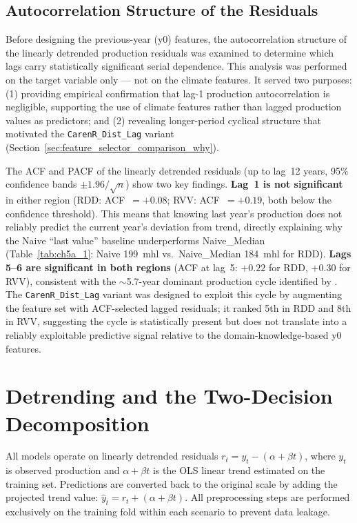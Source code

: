 \subsection{Autocorrelation Structure of the Residuals}\label{sub:autocorrelation_structure_of_the}

Before designing the previous-year (y0) features, the autocorrelation structure of the linearly detrended production residuals was examined to determine which lags carry statistically significant serial dependence. This analysis was performed on the target variable only --- not on the climate features. It served two purposes: (1) providing empirical confirmation that lag-1 production autocorrelation is negligible, supporting the use of climate features rather than lagged production values as predictors; and (2) revealing longer-period cyclical structure that motivated the \texttt{CarenR\_Dist\_Lag} variant (Section~\ref{sec:feature_selector_comparison_why}).

The ACF and PACF of the linearly detrended residuals (up to lag~12 years, 95\% confidence bands $\pm 1.96/\sqrt{n}$) show two key findings. \textbf{Lag~1 is not significant} in either region (RDD: ACF~$= +0.08$; RVV: ACF~$= +0.19$, both below the confidence threshold). This means that knowing last year's production does not reliably predict the current year's deviation from trend, directly explaining why the Naive ``last value'' baseline underperforms Naive\_Median (Table~\ref{tab:ch5a_1}: Naive 199~mhl vs.\ Naive\_Median 184~mhl for RDD). \textbf{Lags 5--6 are significant in both regions} (ACF at lag~5: $+0.22$ for RDD, $+0.30$ for RVV), consistent with the $\sim$5.7-year dominant production cycle identified by \citet{Cunha2020}. The \texttt{CarenR\_Dist\_Lag} variant was designed to exploit this cycle by augmenting the feature set with ACF-selected lagged residuals; it ranked 5th in RDD and 8th in RVV, suggesting the cycle is statistically present but does not translate into a reliably exploitable predictive signal relative to the domain-knowledge-based y0 features.

\section{Detrending and the Two-Decision Decomposition}\label{sec:detrending_and_the_twodecision}

All models operate on linearly detrended residuals $r_t = y_t - (\alpha + \beta t)$, where $y_t$ is observed production and $\alpha + \beta t$ is the OLS linear trend estimated on the training set. Predictions are converted back to the original scale by adding the projected trend value: $\hat{y}_t = r_t + (\alpha + \beta t)$. All preprocessing steps are performed exclusively on the training fold within each scenario to prevent data leakage.


